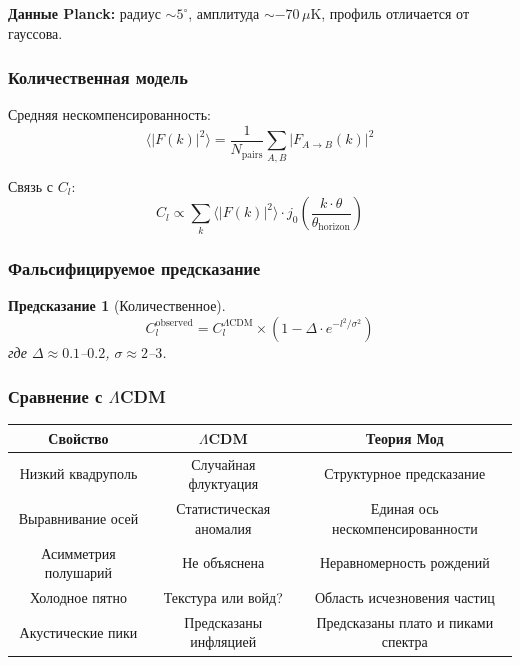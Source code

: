 \documentclass[12pt,a4paper]{article}
\newtheorem{prediction}{Предсказание}[section]
\begin{document}
\textbf{Данные Planck:} радиус $\sim 5^\circ$, амплитуда $\sim -70\,\mu\text{K}$, профиль отличается от гауссова.

\subsubsection{Количественная модель}

Средняя нескомпенсированность:
\begin{equation}
    \langle |F(k)|^2 \rangle = \frac{1}{N_{\text{pairs}}} \sum_{A,B} |F_{A \to B}(k)|^2
\end{equation}

Связь с $C_l$:
\begin{equation}
    C_l \propto \sum_k \langle |F(k)|^2 \rangle \cdot j_0\!\left( \frac{k \cdot \theta}{\theta_{\text{horizon}}} \right)
\end{equation}

\subsubsection{Фальсифицируемое предсказание}

\begin{prediction}[Количественное]
\begin{equation}
    C_l^{\text{observed}} = C_l^{\Lambda\text{CDM}} \times \left( 1 - \Delta \cdot e^{-l^2 / \sigma^2} \right)
\end{equation}
где $\Delta \approx 0.1$--$0.2$, $\sigma \approx 2$--$3$.
\end{prediction}

\subsubsection{Сравнение с $\Lambda$CDM}

\begin{center}
\begin{tabular}{c|c|c}
\textbf{Свойство} & \textbf{$\Lambda$CDM} & \textbf{Теория Мод} \\
\hline
Низкий квадруполь & Случайная флуктуация & Структурное предсказание \\
Выравнивание осей & Статистическая аномалия & Единая ось нескомпенсированности \\
Асимметрия полушарий & Не объяснена & Неравномерность рождений \\
Холодное пятно & Текстура или войд? & Область исчезновения частиц \\
Акустические пики & Предсказаны инфляцией & Предсказаны плато и пиками спектра
\end{tabular}
\end{center}
\end{document}
